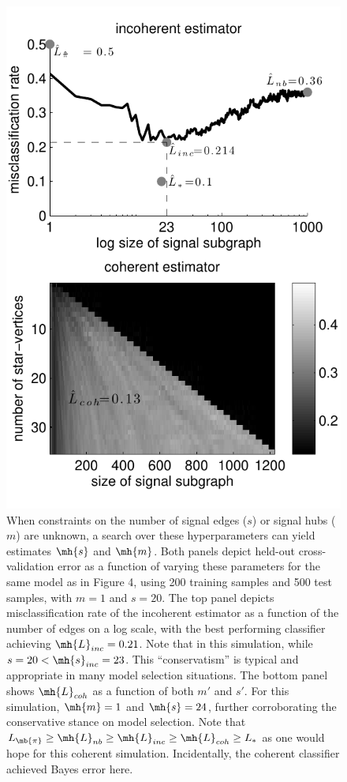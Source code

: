 \documentclass[10pt,journal,cspaper,compsoc]{IEEEtran}
\begin{document}
\begin{figure}[htbp]
	\centering
		\includegraphics[width=0.8\linewidth]{../figs/coherent_image_V70_s20_p10_q30_nTr200_nTe500.pdf}
	\caption{ When constraints on the number of signal edges ($s$) or signal hubs ($m$) are unknown, a search over these hyperparameters can yield estimates $\mh{s}$ and $\mh{m}$.  Both panels depict held-out cross-validation error as a function of varying these parameters for the same model as in Figure 4, using 200 training samples and 500 test samples, with $m=1$ and $s=20$.  The top panel depicts misclassification rate of the incoherent estimator as a function of the number of edges on a log scale, with the best performing classifier achieving $\mh{L}_{inc}=0.21$. Note that in this simulation, while $s=20< \mh{s}_{inc}=23$.  This ``conservatism'' is typical and appropriate in many model selection situations.  The bottom panel shows $\mh{L}_{coh}$ as a function of both $m'$ and $s'$.  For this simulation, $\mh{m}=1$ and $\mh{s}=24$, further corroborating the conservative stance on model selection. Note that $L_{\mb{\pi}} \geq \mh{L}_{nb} \geq \mh{L}_{inc} \geq \mh{L}_{coh} \geq L_*$ as one would hope for this coherent simulation.  Incidentally, the coherent classifier achieved Bayes error here.}
	\label{fig:coherent}
\end{figure}
\end{document}

